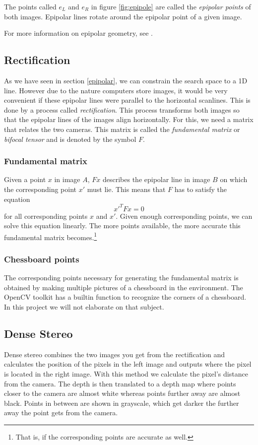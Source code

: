 \documentclass[a4paper]{article}
\begin{document}
The points called $e_{L}$ and $e_{R}$ in figure \ref{fig:epipole} are
called the \emph{epipolar points} of both images. Epipolar lines
rotate around the epipolar point of a given image.

For more information on epipolar geometry, see \cite{Hartley2004}.

\subsection{Rectification}
\label{rectification} As we have seen in section \ref{epipolar}, we
can constrain the search space to a 1D line. However due to the nature
computers store images, it would be very convenient if these epipolar
lines were parallel to the horizontal scanlines.  This is done by a
process called \emph{rectification}. This process transforms both
images so that the epipolar lines of the images align
horizontally. For this, we need a matrix that relates the two
cameras. This matrix is called the \emph{fundamental matrix} or
\emph{bifocal tensor} and is denoted by the symbol $F$.

\subsubsection{Fundamental matrix} Given a point $x$ in image $A$,
$Fx$ describes the epipolar line in image $B$ on which the
corresponding point $x'$ must lie. This means that $F$ has to satisfy
the equation
\[ x'^{T}Fx = 0 \] for all corresponding points $x$ and $x'$. Given
enough corresponding points, we can solve this equation linearly. The
more points available, the more accurate this fundamental matrix
becomes.\footnote{That is, if the corresponding points are accurate as
well.}

\subsubsection{Chessboard points} The corresponding points necessary
for generating the fundamental matrix is obtained by making multiple
pictures of a chessboard in the environment. The OpenCV toolkit has a
builtin function to recognize the corners of a chessboard.  In this
project we will not elaborate on that subject.

\subsection{Dense Stereo} 
Dense stereo combines the two images you get from the rectification
and calculates the position of the pixels in the left image and
outputs where the pixel is located in the right image. With this
method we calculate the pixel's distance from the camera.  The depth
is then translated to a depth map where points closer to the camera
are almost white whereas points further away are almost black. Points
in between are shown in grayscale, which get darker the further away
the point gets from the camera.
\end{document}
